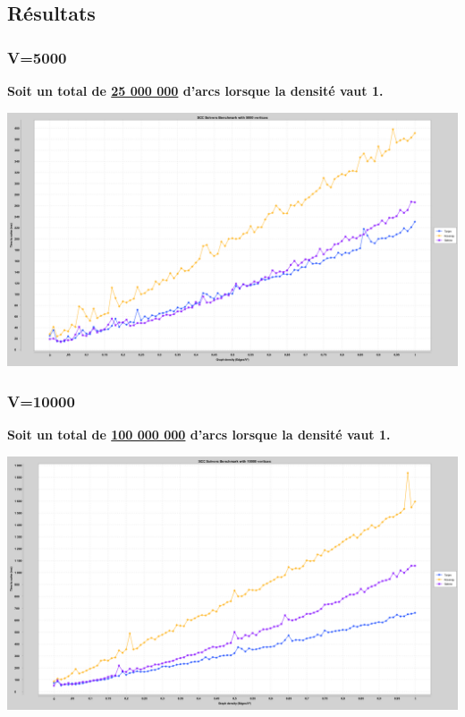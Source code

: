 \documentclass[11pt,a4paper]{article}
\begin{document}
\pagebreak
\subsection{Résultats}

\subsubsection{V=5000}
\textbf{Soit un total de \underline{25 000 000} d'arcs lorsque la densité vaut 1.}
\begin{center}
\includegraphics[keepaspectratio=true,width=\linewidth]{./SCCSolvers_5000.png}
\end{center}

\subsubsection{V=10000}
\textbf{Soit un total de \underline{100 000 000} d'arcs lorsque la densité vaut 1.}
\begin{center}
\includegraphics[keepaspectratio=true,width=\linewidth]{./SCCSolvers_10000.png}
\end{center}
\end{document}
